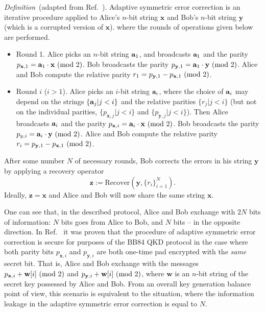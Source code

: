 \documentclass[aps,pra,twocolumn,amsmath,amssymb,nofootinbib,showpacs,superscriptaddress]{revtex4-1}
\newcommand{\xb}{\mathbf{x}}
\newcommand{\yb}{\mathbf{y}}
\newcommand{\zb}{\mathbf{z}}
\newcommand{\modt}{({\rm mod}~2)}
\begin{document}
\emph{Definition}~(adapted from Ref.~\cite{LO_decoupling}). 
Adaptive symmetric error correction is an iterative procedure applied to Alice's $n$-bit string $\xb$ and Bob's $n$-bit string $\yb$ (which is a corrupted version of $\xb$). 
where the rounds of operations given below are performed.
\begin{itemize}
	\item Round 1. Alice picks an $n$-bit string ${\bf a}_1$, and broadcasts ${\bf a}_1$ and the parity $p_{\xb,1} = \ab_1 \cdot \xb~\modt$. 
	Bob broadcasts the parity $p_{\yb,1} = \ab_1 \cdot \yb~\modt$. 
	Alice and Bob compute the relative parity $r_1=p_{\yb,1}-p_{\xb,1}~\modt$.
	\item Round $i$ ($i>1$). Alice picks an $i$-bit string ${\bf a}_i$, where the choice of ${\bf a}_i$ may depend on the strings $\{{\bf a}_j|j<i\}$ and the relative parities $\{r_j|j<i\}$ 
	(but not on the individual parities, $\{p_{\xb,j}|j<i\}$ and $\{p_{\yb,j}|j<i\}$).
	Then Alice broadcasts ${\bf a}_i$ and the parity $p_{\xb,i} = \ab_i \cdot \xb~\modt$. 
	Bob broadcasts the parity $p_{y,i} = \ab_i \cdot \yb~\modt$. 
	Alice and Bob compute the relative parity $r_i=p_{\yb,1}-p_{\xb,1}~\modt$.
\end{itemize}
After some number $N$ of necessary rounds, Bob corrects the errors in his string $\yb$ by applying a recovery operator 
\begin{equation}
	\zb:=\mathrm{Recover}(\yb, \{r_i\}_{i=1}^N).
\end{equation}
Ideally, $\zb = \xb$ and Alice and Bob will now share the same string $\xb$.

One can see that, in the described protocol, Alice and Bob exchange with $2N$ bits of information: $N$ bits goes from Alice to Bob, and $N$ bits -- in the opposite direction.
In Ref.~\cite{LO_decoupling} it was proven that the procedure of adaptive symmetric error correction is secure for purposes of the BB84 QKD protocol in the case where both parity bits $p_{\xb,i}$ 
and $p_{\yb,i}$ are both one-time pad encrypted with the \emph{same} secret bit.
That is, Alice and Bob exchange with the messages $p_{\xb,i}+\mathbf{w}[i]~\modt$ and $p_{\yb,i}+\mathbf{w}[i]~\modt$, 
where $\mathbf{w}$ is an $n$-bit string of the secret key possessed by Alice and Bob.
From an overall key generation balance point of view, this scenario is equivalent to the situation, where the information leakage in the adaptive symmetric error correction is equal to $N$.
\end{document}
